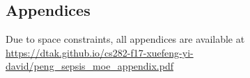 \documentclass[10pt]{amia}
\begin{document}
\begin{appendices}

\section*{Appendices}

\label{appendices}
Due to space constraints, all appendices are available at \\
\href{https://dtak.github.io/cs282-f17-xuefeng-yi-david/peng\_sepsis\_moe\_appendix.pdf}{https://dtak.github.io/cs282-f17-xuefeng-yi-david/peng\_sepsis\_moe\_appendix.pdf}





\end{appendices}
\end{document}
